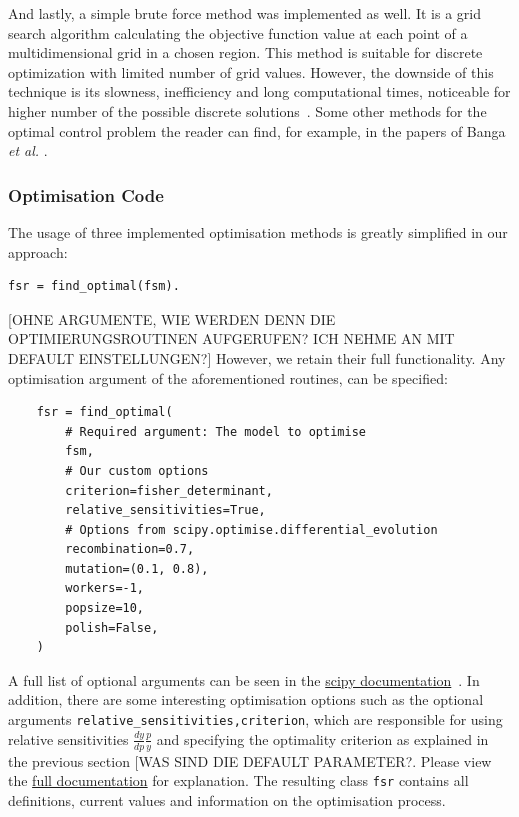 \documentclass[10pt,A4paper]{article}
\newcommand{\etal}{{\textit{et al. }}}
\begin{document}
And lastly, a simple brute force method was implemented as well.
It is a grid search algorithm calculating the objective function value at each point of a multidimensional grid in a chosen region.
This method is suitable for discrete optimization with limited number of grid values.
However, the downside of this technique is its slowness, inefficiency and long computational times, noticeable for higher number of the possible discrete solutions~\cite{scipybrute}.
\newline
Some other methods for the optimal control problem the reader can find, for example, in the papers of Banga \etal \cite{banga_global_1996, banga_dynamic_2005, BANGA2005407, bangaImprovingFoodProcessing2003}.
%
\subsubsection*{Optimisation Code}
The usage of three implemented optimisation methods is greatly simplified in our approach: 
\begin{verbatim}
fsr = find_optimal(fsm).
\end{verbatim}
[OHNE ARGUMENTE, WIE WERDEN DENN DIE OPTIMIERUNGSROUTINEN AUFGERUFEN? ICH NEHME AN MIT DEFAULT EINSTELLUNGEN?]
However, we retain their full functionality. Any optimisation argument of the aforementioned routines, can be specified: 
\begin{verbatim}
    fsr = find_optimal(
        # Required argument: The model to optimise
        fsm,
        # Our custom options
        criterion=fisher_determinant,
        relative_sensitivities=True,
        # Options from scipy.optimise.differential_evolution
        recombination=0.7,
        mutation=(0.1, 0.8),
        workers=-1,
        popsize=10,
        polish=False,
    )
\end{verbatim}
A full list of optional arguments can be seen in the \href{https://docs.scipy.org/doc/scipy/reference/optimize.html#global-optimization}{scipy documentation}~\cite{virtanenSciPyFundamentalAlgorithms2020}.
In addition, there are some interesting optimisation options such as the optional arguments \texttt{relative_sensitivities,criterion}, which are responsible for using relative sensitivities $\tfrac{dy}{dp}\tfrac{p}{y}$ and specifying the optimality criterion as explained in the previous section [WAS SIND DIE DEFAULT PARAMETER?.
Please view the \href{https://spatial-systems-biology-freiburg.github.io/FisInMa/}{full documentation} for explanation.
The resulting class \texttt{fsr} contains all definitions, current values and information on the optimisation process.
%
\end{document}
